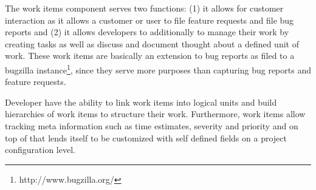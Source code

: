 The work items component serves two functions: (1) it allows for customer interaction as it allows a customer or user to file feature requests and file bug reports and (2) it allows developers to additionally to manage their work by creating tasks as well as discuss and document thought about a defined unit of work.
These work items are basically an extension to bug reports as filed to a bugzilla instance\footnote{http://www.bugzilla.org/}, since they serve more purposes than capturing bug reports and feature requests.

Developer have the ability to link work items into logical units and build hierarchies of work items to structure their work.
Furthermore, work items allow tracking meta information such as time estimates, severity and priority and on top of that lends itself to be customized with self defined fields on a project configuration level.


